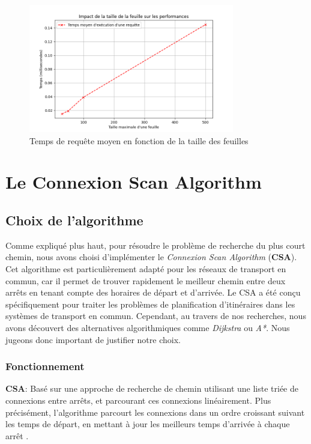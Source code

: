 \documentclass[12pt]{article}
\begin{document}
\begin{figure}[h]
    \centering
    \includegraphics[width=0.8\textwidth]{images/average-query-time.png}
    \caption{Temps de requête moyen en fonction de la taille des feuilles}
\end{figure}


\newpage
\section{Le Connexion Scan Algorithm}
\label{sec:algorithme}
\subsection{Choix de l'algorithme}
Comme expliqué plus haut, pour résoudre le problème de recherche du plus court chemin, nous avons choisi d'implémenter le \emph{Connexion Scan Algorithm} (\textbf{CSA}).
Cet algorithme est particulièrement adapté pour les réseaux de transport en commun, car il permet de trouver rapidement le meilleur chemin
entre deux arrêts en tenant compte des horaires de départ et d'arrivée. Le CSA a été conçu spécifiquement pour traiter les problèmes de planification d'itinéraires 
dans les systèmes de transport en commun. Cependant, au travers de nos recherches, nous avons découvert des alternatives algorithmiques comme \emph{Dijkstra} ou \emph{A*}.
Nous jugeons donc important de justifier notre choix.

\subsubsection{Fonctionnement}
\textbf{CSA}: Basé sur une approche de recherche de chemin utilisant une liste triée de connexions entre arrêts, et parcourant ces connexions linéairement.
Plus précisément, l'algorithme parcourt les connexions dans un ordre croissant suivant les temps de départ, en mettant à jour les meilleurs temps d'arrivée à 
chaque arrêt  \cite{dibbelt2017connection}.
\end{document}
